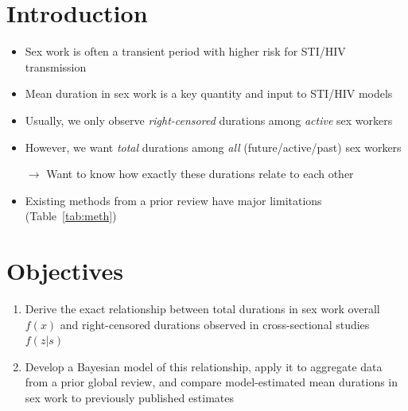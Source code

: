 \section{Introduction}
\begin{itemize}
  \item Sex work is often a transient period with higher risk for STI/HIV transmission \cite{Scorgie2012}
  \item Mean duration in sex work is a key quantity and input to STI/HIV models
  \item Usually, we only observe \emph{right-censored} durations among \emph{active} sex workers \cite{Fazito2012}
  \item However, we want \emph{total} durations among \emph{all} (future/active/past) sex workers
   \par $\rightarrow$ Want to know how exactly these durations relate to each other
  \item Existing methods from a prior review \cite{Fazito2012} have major limitations (Table~\ref{tab:meth})
\end{itemize}

\section{Objectives}
\begin{enumerate}
  \item Derive the exact relationship between
        total durations in sex work overall $f(x)$ and
        right-censored durations observed in cross-sectional studies $f(z|s)$
  \item Develop a Bayesian model of this relationship,
        apply it to aggregate data from a prior global review,\cite{Fazito2012}
        and compare model-estimated mean durations in sex work
        to previously published estimates
\end{enumerate}
